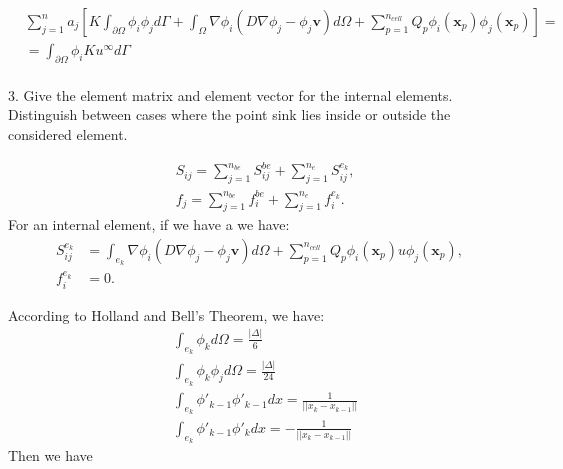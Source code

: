 \documentclass[a4paper,10pt]{report}
\begin{document}
  \begin{align}\label{eq:5}\nonumber
  &\sum_{j=1}^{n}a_j[K\int_{\partial\Omega} \phi_i \phi_jd\Gamma +\int_{\Omega}\nabla\phi_i (D\nabla{\phi_j}- \phi_j\mathbf{v}) d\Omega+\sum_{p=1}^{n_{cell}}Q_p\phi_i(\mathbf{x}_p) \phi_j(\mathbf{x}_p)]=\\\nonumber
   &=\int_{\partial\Omega} \phi_i K u^{\infty}d\Gamma  \\
\end{align}


3. Give the element matrix and element vector for the internal elements.
Distinguish between cases where the point sink lies inside or outside the
considered element.

\begin{align*}
 &S_{ij}=\sum_{j=1}^{n_{be}}S_{ij}^{be}+\sum_{j=1}^{n_e}S_{ij}^{e_k},\\
 &f_{j}=\sum_{j=1}^{n_{be}}f_{i}^{be}+\sum_{j=1}^{n_e}f_{i}^{e_k}.
\end{align*}
For an internal element, if we have a  we have:
\begin{align*}
S_{ij}^{e_k}&=\int_{e_k}\nabla\phi_i (D\nabla{\phi_j}- \phi_j\mathbf{v}) d\Omega+\sum_{p=1}^{n_{cell}}Q_p\phi_i(\mathbf{x}_p) u\phi_j(\mathbf{x}_p),\\
f_i^{e_k}&=0.
\end{align*}

According to Holland and Bell's Theorem, we have:
\begin{align*}
     &\int_{e_k}\phi_{k} d\Omega =\frac{|\Delta|}{6}\\
      &\int_{e_k}\phi_{k} \phi_{j} d\Omega =\frac{|\Delta|}{24} \\
      &\int_{e_k}\phi'_{k-1}\phi'_{k-1} dx=\frac{1}{||x_k-x_{k-1}||}\\
   &\int_{e_k}\phi'_{k-1}\phi'_{k} dx=-\frac{1}{||x_k-x_{k-1}||}
\end{align*}
Then we have 
\end{document}
